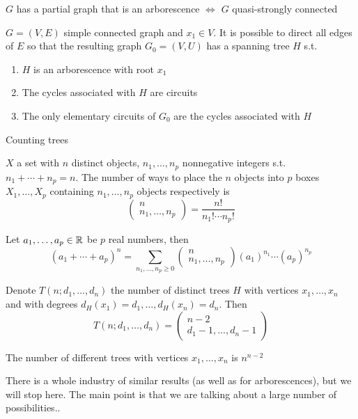 \documentclass[aspectratio=43]{beamer}
\begin{document}
\begin{frame}
\begin{theorem}
$G$ has a partial graph that is an arborescence $\iff$ $G$ quasi-strongly connected
\end{theorem}
\vfill
\begin{theorem}
$G=(V,E)$ simple connected graph and $x_1\in V$. It is possible to direct all edges of $E$ so that the resulting graph $G_0=(V,U)$ has a spanning tree $H$ s.t.
\begin{enumerate}
	\item $H$ is an arborescence with root $x_1$
	\item The cycles associated with $H$ are circuits
	\item The only elementary circuits of $G_0$ are the cycles associated with $H$
\end{enumerate}
\end{theorem}
\end{frame}


\begin{frame}{Counting trees}
\begin{proposition}
$X$ a set with $n$ distinct objects, $n_1,\ldots,n_p$ nonnegative integers s.t. $n_1+\cdots+n_p=n$. The number of ways to place the $n$ objects into $p$ boxes $X_1,\ldots,X_p$ containing $n_1,\ldots,n_p$ objects respectively is 
\[
	\begin{pmatrix}
		n\\ n_1,\ldots,n_p
	\end{pmatrix}
	=
	\frac{n!}{n_1!\cdots n_p!}
\]
\end{proposition}
\vfill
\begin{proposition}
Let $a_1,\ldots,a_p\in\mathbb{R}$ be $p$ real numbers, then
\[
	(a_1+\cdots+a_p)^n= 
	\sum_{n_1,\ldots,n_p\geq 0}
	\begin{pmatrix}
		n\\ n_1,\ldots,n_p
	\end{pmatrix}
	(a_1)^{n_1}\cdots(a_p)^{n_p}	
\]
\end{proposition}
\end{frame}


\begin{frame}
\begin{theorem}
Denote $T(n;d_1,\ldots,d_n)$ the number of distinct trees $H$ with vertices $x_1,\ldots,x_n$ and with degrees $d_H(x_1)=d_1,\ldots,d_H(x_n)=d_n$. Then
\[
	T(n;d_1,\ldots,d_n) = 
	\begin{pmatrix}
		n-2 \\
		d_1-1,\ldots,d_n-1
	\end{pmatrix}
\]
\end{theorem}
\vfill
\begin{theorem}
The number of different trees with vertices $x_1,\ldots,x_n$ is 
$n^{n-2}$
\end{theorem}
\vfill
There is a whole industry of similar results (as well as for arborescences), but we will stop here. The main point is that we are talking about a large number of possibilities..
\end{frame}



\end{document}
